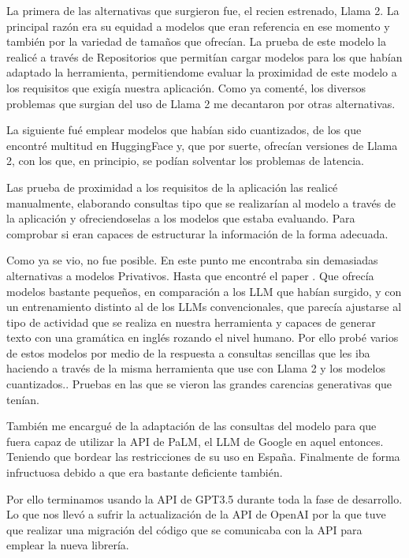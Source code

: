 La primera de las alternativas que surgieron fue, el recien estrenado, Llama 2. La principal razón era su equidad a modelos que eran referencia en ese momento y también por la variedad de tamaños que ofrecían. La prueba de este modelo la realicé a través de Repositorios que permitían cargar modelos para los que habían adaptado la herramienta, permitiendome evaluar la proximidad de este modelo a los requisitos que exigía nuestra aplicación. Como ya comenté, los diversos problemas que surgian del uso de Llama 2 me decantaron por otras alternativas.

La siguiente fué emplear modelos que habían sido cuantizados, de los que encontré multitud en HuggingFace y, que por suerte, ofrecían versiones de Llama 2, con los que, en principio, se podían solventar los problemas de latencia.

Las prueba de proximidad a los requisitos de la aplicación las realicé manualmente, elaborando consultas tipo que se realizarían al modelo a través de la aplicación y ofreciendoselas a los modelos que estaba evaluando. Para comprobar si eran capaces de estructurar la información de la forma adecuada.

Como ya se vio, no fue posible. En este punto me encontraba sin demasiadas alternativas a modelos Privativos. Hasta que encontré el paper \cite{eldan2023tinystories} . Que ofrecía modelos bastante pequeños, en comparación a los LLM que habían surgido, y con un entrenamiento distinto al de los LLMs convencionales, que parecía ajustarse al tipo de actividad que se realiza en nuestra herramienta y capaces de generar texto con una gramática en inglés rozando el nivel humano. Por ello probé varios de estos modelos por medio de la respuesta a consultas sencillas que les iba haciendo a través de la misma herramienta que use con Llama 2 y los modelos cuantizados.. Pruebas en las que se vieron las grandes carencias generativas que tenían.

También me encargué de la adaptación de las consultas del modelo para que fuera capaz de utilizar la API de PaLM, el LLM de Google en aquel entonces. Teniendo que bordear las restricciones de su uso en España. Finalmente de forma infructuosa debido a que era bastante deficiente también.

Por ello terminamos usando la API de GPT3.5 durante toda la fase de desarrollo. Lo que nos llevó a sufrir la actualización de la API de OpenAI por la que tuve que realizar una migración del código que se comunicaba con la API para emplear la nueva librería.


